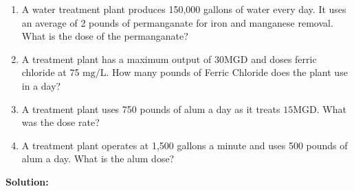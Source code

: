 \documentclass{article}
\begin{document}
\begin{enumerate}

\item A water treatment plant produces 150,000 gallons of water every day. It uses an
average of 2 pounds of permanganate for iron and manganese removal. What is the dose of the
permanganate? 





\item A treatment plant has a maximum output of $30 \mathrm{MGD}$ and doses ferric chloride at 75 $\mathrm{mg} / \mathrm{L}$. How many pounds of Ferric Chloride does the plant use in a day?\\

\item  A treatment plant uses 750 pounds of alum a day as it treats $15 \mathrm{MGD}$. What was the dose rate?\\


\item  A treatment plant operates at 1,500 gallons a minute and uses 500 pounds of alum a day. What is the alum dose?\\

\end{enumerate}
\newpage
\textbf{Solution:}
\end{document}
